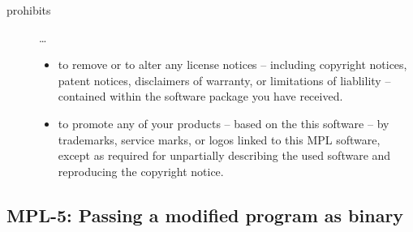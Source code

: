\begin{description}
\begin{itemize}
 \end{itemize}
 
\item[prohibits] \ldots
\begin{itemize}
  \item to remove or to alter any license notices -- including copyright
  notices, patent notices, disclaimers of warranty, or limitations of liablility
  -- contained within the software package you have received.
  \item to promote any of your products -- based on the this software -- by
  trademarks, service marks, or logos linked to this MPL software, except as
  required for unpartially describing the used software and reproducing the
  copyright notice.
\end{itemize}

\end{description}

\subsection{MPL-5: Passing a modified program as binary}
\label{OSUC-04B-MPL} 

